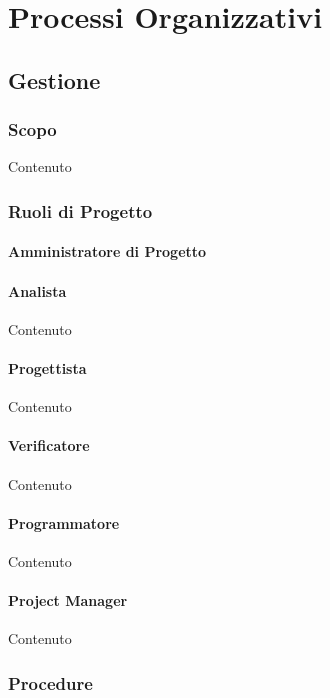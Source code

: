 \section{Processi Organizzativi}

    \subsection{Gestione}

    \subsubsection{Scopo}
    Contenuto

    
    \subsubsection{Ruoli di Progetto}

    \paragraph{Amministratore di Progetto}

    \paragraph{Analista}
    Contenuto

    \paragraph{Progettista}
    Contenuto

    \paragraph{Verificatore}
    Contenuto

    \paragraph{Programmatore}
    Contenuto

    \paragraph{Project Manager}
    Contenuto

    
    \subsubsection{Procedure}

